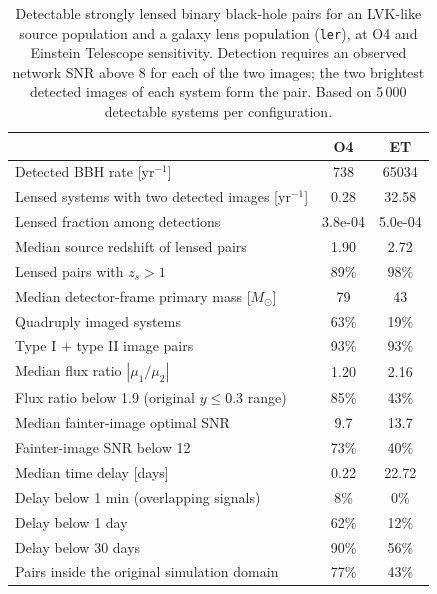 \begin{table}[t]
\caption{Detectable strongly lensed binary black-hole pairs for an LVK-like source population and a galaxy lens population (\texttt{ler}), at O4 and Einstein Telescope sensitivity. Detection requires an observed network SNR above 8 for each of the two images; the two brightest detected images of each system form the pair. Based on 5\,000 detectable systems per configuration.}
\label{tab:population}
\begin{ruledtabular}
\begin{tabular}{lcc}
 & O4 & ET \\
\hline
Detected BBH rate [yr$^{-1}$] & 738 & 65034 \\
Lensed systems with two detected images [yr$^{-1}$] & 0.28 & 32.58 \\
Lensed fraction among detections & 3.8e-04 & 5.0e-04 \\
Median source redshift of lensed pairs & 1.90 & 2.72 \\
Lensed pairs with $z_s>1$ & 89\% & 98\% \\
Median detector-frame primary mass [$M_\odot$] & 79 & 43 \\
Quadruply imaged systems & 63\% & 19\% \\
Type I + type II image pairs & 93\% & 93\% \\
Median flux ratio $|\mu_1/\mu_2|$ & 1.20 & 2.16 \\
Flux ratio below 1.9 (original $y\le0.3$ range) & 85\% & 43\% \\
Median fainter-image optimal SNR & 9.7 & 13.7 \\
Fainter-image SNR below 12 & 73\% & 40\% \\
Median time delay [days] & 0.22 & 22.72 \\
Delay below 1 min (overlapping signals) & 8\% & 0\% \\
Delay below 1 day & 62\% & 12\% \\
Delay below 30 days & 90\% & 56\% \\
Pairs inside the original simulation domain & 77\% & 43\% \\
\end{tabular}
\end{ruledtabular}
\end{table}
